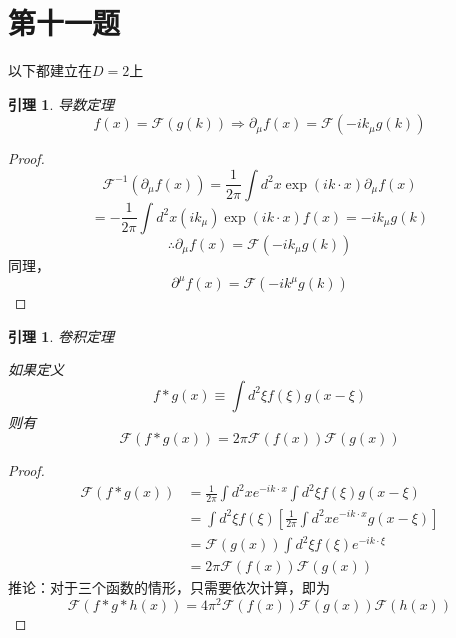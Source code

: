 \documentclass[a4paper]{ctexart}
\newtheorem{yinli}[subsection]{引理}
\begin{document}
\section{第十一题}
以下都建立在$D=2$上
\begin{yinli}{导数定理}\label{11dao}
    $$
        f\left( x \right) =\mathcal{F}\left( g\left( k \right) \right) \Rightarrow \partial _{\mu}f\left( x \right) =\mathcal{F}\left( -ik_{\mu}g\left( k \right) \right)
    $$
\end{yinli}
\begin{proof}
    $$
        \mathcal{F}^{-1}\left( \partial _{\mu}f\left( x \right) \right) =\frac{1}{2\pi}\int{d^2x\exp \left( ik\cdot x \right)}\partial _{\mu}f\left( x \right)
    $$
    $$
        =-\frac{1}{2\pi}\int{d^2x\left( ik_{\mu} \right) \exp \left( ik\cdot x \right)}f\left( x \right) =-ik_{\mu}g\left( k \right)
    $$
    $$
        \therefore \partial _{\mu}f\left( x \right) =\mathcal{F}\left( -ik_{\mu}g\left( k \right) \right)
    $$
    同理，
    $$
        \partial ^{\mu}f\left( x \right) =\mathcal{F}\left( -ik^{\mu}g\left( k \right) \right)
    $$

\end{proof}
\begin{yinli}{卷积定理}\label{11juan}

    如果定义
    $$
        f*g\left( x \right) \equiv \int{d^2\xi f\left( \xi \right)}g\left( x-\xi \right)
    $$
    则有
    $$
        \mathcal{F}\left( f*g\left( x \right) \right) =2\pi \mathcal{F}\left( f\left( x \right) \right) \mathcal{F}\left( g\left( x \right) \right)
    $$
\end{yinli}
\begin{proof}
    $$
        \begin{aligned}
            \mathcal{F}\left( f*g\left( x \right) \right)
             & =\frac{1}{2\pi}\int{d^2xe^{-ik\cdot x}}\int{d^2\xi f\left( \xi \right)}g\left( x-\xi \right)                \\
             & =\int{d^2\xi}f\left( \xi \right) \left[ \frac{1}{2\pi}\int{d^2x}e^{-ik\cdot x}g\left( x-\xi \right) \right] \\
             & =\mathcal{F}\left( g\left( x \right) \right) \int{d^2\xi}f\left( \xi \right) e^{-ik\cdot \xi}               \\
             & =2\pi \mathcal{F}\left( f\left( x \right) \right) \mathcal{F}\left( g\left( x \right) \right)
        \end{aligned}
    $$
    推论：对于三个函数的情形，只需要依次计算，即为
    $$
        \mathcal{F}\left( f*g*h\left( x \right) \right) =4\pi ^2\mathcal{F}\left( f\left( x \right) \right) \mathcal{F}\left( g\left( x \right) \right) \mathcal{F}\left( h\left( x \right) \right)
    $$


\end{proof}
\end{document}
